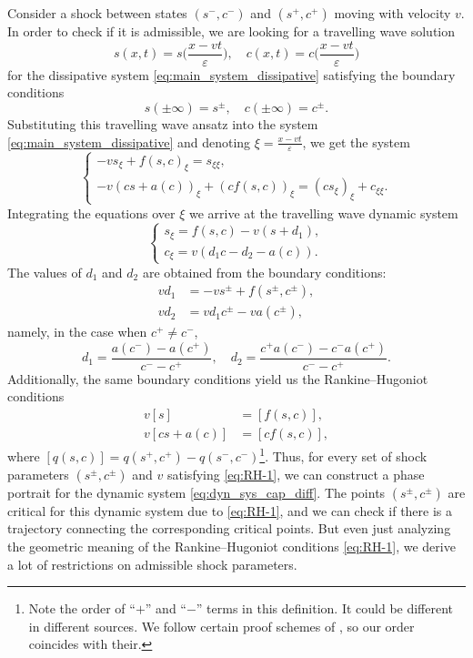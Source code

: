 \documentclass[12pt]{article}
\theoremstyle{definition}
\begin{document}
Consider a shock between states $(s^-, c^-)$ and $(s^+, c^+)$ moving with velocity $v$. In order to check if it is admissible, we are looking for a travelling wave solution 
\[
s(x,t) = s\Big(\frac{x - vt}{\varepsilon}\Big), \quad c(x,t) = c\Big(\frac{x - vt}{\varepsilon}\Big)
\]
for the dissipative system \eqref{eq:main_system_dissipative}
satisfying the boundary conditions 
\[
s(\pm\infty) = s^\pm, \quad c(\pm\infty)  = c^\pm.
\]
Substituting this travelling wave ansatz into the system \eqref{eq:main_system_dissipative} and denoting $\xi = \frac{x - vt}{\varepsilon}$, we get the system
\begin{equation*}
\begin{cases} 
-v s_\xi + f(s, c)_\xi = s_{\xi\xi}, \\
-v (cs + a(c))_\xi + (cf(s,c))_\xi  = (c s_\xi)_\xi + c_{\xi\xi}.
\end{cases}
\end{equation*}
Integrating the equations over $\xi$ we arrive at the travelling wave dynamic system
\begin{equation}\label{eq:dyn_sys_cap_diff}
\begin{cases} 
s_\xi = f(s, c) - v (s + d_1), \\
c_\xi = v (d_1 c - d_2 - a(c)).
\end{cases}
\end{equation}
The values of $d_1$ and $d_2$ are obtained from the boundary conditions:
\begin{align*}
    vd_1 & = -vs^\pm + f(s^\pm, c^\pm), \\
    vd_2 & = v d_1 c^\pm - v a(c^\pm),
\end{align*}
namely, in the case when $c^+ \neq c^-$,
\begin{equation*}
d_1 = \dfrac{a(c^-) - a(c^+)}{c^- - c^+}, \quad d_2 =  \dfrac{c^+ a(c^-) - c^- a(c^+)}{c^- - c^+}.
\end{equation*}
Additionally, the same boundary conditions yield us the Rankine--Hugoniot conditions
\begin{equation}
\label{eq:RH-1}
\begin{split}
    v[s]&=[f(s,c)],
    \\
    v[cs+a(c)]&=[cf(s,c)],
\end{split}
\end{equation}
where $[q(s,c)]=q(s^+,c^+)-q(s^-,c^-)$\footnote{Note the order of ``$+$'' and ``$-$'' terms in this definition. It could be different in different sources. We follow certain proof schemes of \cite{Serre1}, so our order coincides with their.}. Thus, for every set of shock parameters $(s^{\pm}, c^{\pm})$ and $v$ satisfying \eqref{eq:RH-1}, we can construct a phase portrait for the dynamic system \eqref{eq:dyn_sys_cap_diff}. The points $(s^\pm, c^\pm)$ are critical for this dynamic system due to \eqref{eq:RH-1}, and we can check if there is a trajectory connecting the corresponding critical points. But even just analyzing the geometric meaning of the Rankine--Hugoniot conditions \eqref{eq:RH-1}, we derive a lot of restrictions on admissible shock parameters.
\end{document}
